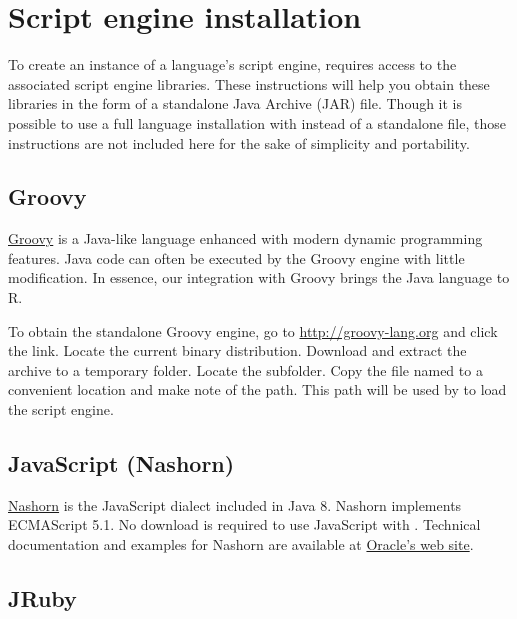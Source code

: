 \hypertarget{scriptengineinstallation}{\section{Script engine installation}}

To create an instance of a language's script engine,  requires access to the associated script engine libraries. These instructions will help you obtain these libraries in the form of a standalone Java Archive (JAR) file. Though it is possible to use a full language installation with  instead of a standalone file, those instructions are not included here for the sake of simplicity and portability. %

\subsection{Groovy}

\href{http://groovy-lang.org}{Groovy} is a Java-like language enhanced with modern dynamic programming features. Java code can often be executed by the Groovy engine with little modification. In essence, our integration with Groovy brings the Java language to R.

To obtain the standalone Groovy engine, go to \url{http://groovy-lang.org} and click the  link. Locate the current binary distribution. Download and extract the archive to a temporary folder. Locate the  subfolder. Copy the file named  to a convenient location and make note of the path. This path will be used by  to load the script engine.

\subsection{JavaScript (Nashorn)}

\href{https://docs.oracle.com/javase/8/docs/technotes/guides/scripting/nashorn/}{Nashorn} is the JavaScript dialect included in Java 8. Nashorn implements ECMAScript 5.1. No download is required to use JavaScript with . Technical documentation and examples for Nashorn are available at \href{https://docs.oracle.com/javase/8/docs/technotes/guides/scripting/nashorn/}{Oracle's web site}.

\subsection{JRuby}

